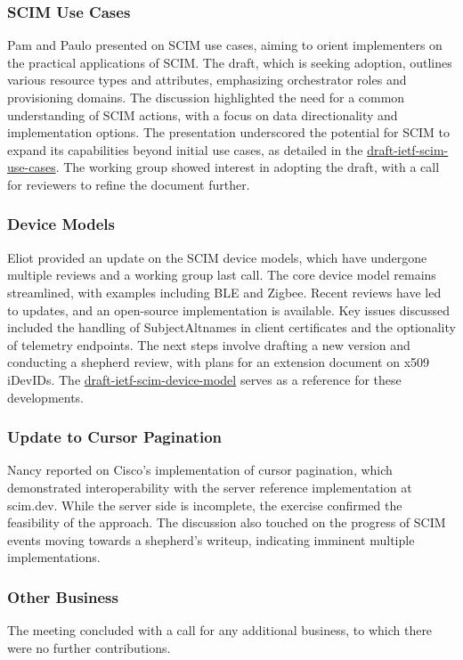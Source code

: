 \documentclass{article}
\begin{document}
\subsubsection{SCIM Use Cases}
Pam and Paulo presented on SCIM use cases, aiming to orient implementers on the practical applications of SCIM. The draft, which is seeking adoption, outlines various resource types and attributes, emphasizing orchestrator roles and provisioning domains. The discussion highlighted the need for a common understanding of SCIM actions, with a focus on data directionality and implementation options. The presentation underscored the potential for SCIM to expand its capabilities beyond initial use cases, as detailed in the \href{https://datatracker.ietf.org/doc/html/draft-correia-scim-use-cases}{draft-ietf-scim-use-cases}. The working group showed interest in adopting the draft, with a call for reviewers to refine the document further.

\subsubsection{Device Models}
Eliot provided an update on the SCIM device models, which have undergone multiple reviews and a working group last call. The core device model remains streamlined, with examples including BLE and Zigbee. Recent reviews have led to updates, and an open-source implementation is available. Key issues discussed included the handling of SubjectAltnames in client certificates and the optionality of telemetry endpoints. The next steps involve drafting a new version and conducting a shepherd review, with plans for an extension document on x509 iDevIDs. The \href{https://datatracker.ietf.org/doc/html/draft-ietf-scim-device-model}{draft-ietf-scim-device-model} serves as a reference for these developments.

\subsubsection{Update to Cursor Pagination}
Nancy reported on Cisco's implementation of cursor pagination, which demonstrated interoperability with the server reference implementation at scim.dev. While the server side is incomplete, the exercise confirmed the feasibility of the approach. The discussion also touched on the progress of SCIM events moving towards a shepherd's writeup, indicating imminent multiple implementations.

\subsubsection{Other Business}
The meeting concluded with a call for any additional business, to which there were no further contributions.
\end{document}

